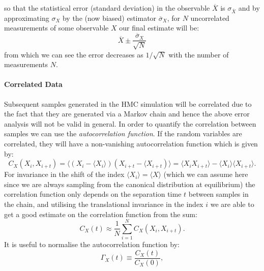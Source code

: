 \documentclass[12pt]{article}
\begin{document}
            so that the statistical error (standard deviation) in the observable $\overline{X}$ is $\sigma_{\overline{X}}$ and by approximating $\sigma_X$ by the (now biased) estimator $\overline{\sigma}_X$, for $N$ uncorrelated measurements of some observable $X$ our final estimate will be:
            \begin{equation}
                \label{eq:niaveerror}
                \overline{X}\pm \frac{\overline{\sigma}_X}{\sqrt{N}}
            \end{equation}
            from which we can see the error decreases as $1/\sqrt{N}$ with the number of measurements $N$.



            \paragraph{Correlated Data} Subsequent samples generated in the HMC simulation will be correlated due to the fact that they are generated via a Markov chain and hence the above error analysis will not be valid in general. In order to quantify the correlation between samples we can use the \textit{autocorrelation function}. If the random variables are correlated, they will have a non-vanishing autocorrelation function which is given by:
            \begin{equation}
                \label{eq:autocorrelationfunction}
                C_{X}\left(X_i,X_{i+t}\right) = \langle \left(X_i-\langle X_i\rangle\right)\left(X_{i+t}-\langle X_{i+t}\right)\rangle = \langle X_iX_{i+t}\rangle - \langle X_i \rangle \langle X_{i+t} \rangle.
            \end{equation}
            For invariance in the shift of the index $\langle X_i \rangle = \langle X \rangle$ (which we can assume here since we are always sampling from the canonical distribution at equilibrium) the correlation function only depends on the separation time $t$ between samples in the chain, and utilising the translational invariance in the index $i$ we are able to get a good estimate on the correlation function from the sum:
            \begin{equation}
                C_{X}\left(t\right) \approx \frac{1}{N}\sum_{i=1}^NC_X\left(X_i,X_{i+t}\right).
            \end{equation}
            It is useful to normalise the autocorrelation function by:
            \begin{equation}
                \label{eq:normalisedAutocorrelation}
                \Gamma_{X}\left(t\right) \equiv \frac{C_X\left(t\right)}{C_X\left(0\right)},
            \end{equation}
\end{document}
